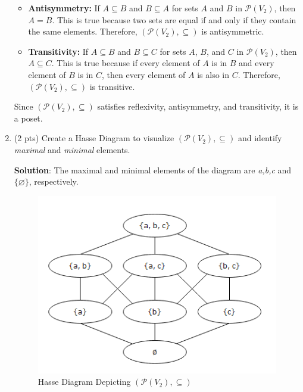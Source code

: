 \documentclass[12pt]{article}
\begin{document}
\begin{spacing}{1.5}
\begin{enumerate}
\begin{itemize}
		      	\item \textbf{Antisymmetry:}
		      	      If \( A \subseteq B \) and \( B \subseteq A \) for sets \( A \) and \( B \) in \( \mathcal{P}(V_2) \), then \( A = B \). This is true because two sets are equal if and only if they contain the same elements. Therefore, \( (\mathcal{P}(V_2),\subseteq) \) is antisymmetric.
		      	      		      	                  
		      	\item \textbf{Transitivity:}
		      	      If \( A \subseteq B \) and \( B \subseteq C \) for sets \( A \), \( B \), and \( C \) in \( \mathcal{P}(V_2) \), then \( A \subseteq C \). This is true because if every element of \( A \) is in \( B \) and every element of \( B \) is in \( C \), then every element of \( A \) is also in \( C \). Therefore, \( (\mathcal{P}(V_2),\subseteq) \) is transitive.
		      \end{itemize}
		      		              
		      Since \( (\mathcal{P}(V_2),\subseteq) \) satisfies reflexivity, antisymmetry, and transitivity, it is a poset.
		      		              
		\item (2 pts) Create a Hasse Diagram to visualize $(\mathcal{P}(V_2),\subseteq)$ and identify \textit{maximal} and \textit{minimal} elements.

            \textbf{Solution}: The maximal and minimal elements of the diagram are \textit{a,b,c} and $\{\varnothing\}$, respectively.
            
		      \begin{figure}[htp]
		      	\centering
		      	\includegraphics{HasseDiagram_6_2_3.png}
		      	\caption{Hasse Diagram Depicting $(\mathcal{P}(V_2),\subseteq)$}
		      	\label{fig:figure}
		      \end{figure}
		      		        

\end{enumerate}
\end{spacing}
\end{document}
